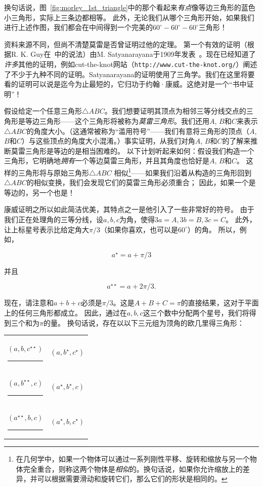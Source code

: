 换句话说，图~\ref{fig:morley_1st_triangle}中的那个看起来\emph{有点}像等边三角形的蓝色小三角形，实际上三条边都相等。
此外，无论我们从哪个三角形开始，如果我们进行上述作图，我们都会在中间得到一个完美的$60^\circ - 60^\circ - 60^\circ$三角形！

资料来源不同，但尚不清楚莫雷是否曾证明过他的定理。
第一个有效的证明（根据R. K. Guy在~\cite{lighthouse}中的说法）由M. Satyanarayana于1909年发表~\cite{satyana}。现在已经知道了\emph{许多}其他的证明，例如cut-the-knot网站（\verb+http://www.cut-the-knot.org/+）阐述了不少于九种不同的证明。Satyanarayana的证明使用了三角学。我们在这里将要看的证明可以说是迄今为止最短的，它归功于约翰·康威。这绝对是一个“书中证明”！

假设给定一个任意三角形${\triangle}ABC$。我们想要证明其顶点为相邻三等分线交点的三角形是等边三角形——这个三角形将被称为\emph{莫雷三角形}。我们还用$A$, $B$和$C$来表示${\triangle}ABC$的角度大小。（这通常被称为“滥用符号”——我们有意将三角形的顶点（$A$, $B$和$C$）与这些顶点的角度大小混淆。）事实证明，从我们对角$A$, $B$和$C$的了解来推断莫雷三角形是等边的是相当困难的。
以下计划听起来如何：假设我们构造一个三角形，它明确地\emph{拥有}一个等边莫雷三角形，并且其角度也恰好是$A$, $B$和$C$。
这样的三角形将与原始三角形${\triangle}ABC$ 相似\footnote{在几何学中，如果一个物体可以通过一系列刚性平移、旋转和缩放与另一个物体完全重合，则称这两个物体是\emph{相似}的。换句话说，如果你允许缩放上的差异，并可以根据需要滑动和旋转它们，那么它们的形状是相同的。}——如果我们沿着从构造的三角形回到${\triangle}ABC$的相似变换，我们会发现它们的莫雷三角形必须重合；
因此，如果一个是等边的，另一个也是！

康威证明之所以如此简洁优美，其特点之一是他引入了一些非常好的符号。
由于我们正在处理角的三等分线，设$a, b, c$为角，使得$3a=A, 3b=B, 3c=C$。
此外，让上标星号表示比给定角大$\pi/3$（如果你喜欢，也可以是$60^\circ$）的角。
所以，例如，

\[ a^\star = a + \pi/3 \]

\noindent 并且

\[ a^{\star\star} = a + 2\pi/3. \]

现在，请注意和$a+b+c$必须是$\pi/3$。这是$A+B+C=\pi$的直接结果，这对于平面上的任何三角形都成立。
因此，通过在$a, b, c$这三个数中分配两个星号，我们将得到三个和为$\pi$的量。
换句话说，存在以以下三元组为顶角的欧几里得三角形：

\begin{center}
\begin{tabular}{cc}
\rule{0pt}{18pt} $(a, b, c^{\star\star})$ \rule{18pt}{0pt} & $(a, b^\star, c^\star)$ \\
\rule{0pt}{18pt} $(a, b^{\star\star}, c)$ \rule{18pt}{0pt} & $(a^\star, b^\star, c)$ \\
\rule{0pt}{18pt} $(a^{\star\star}, b, c)$ \rule{18pt}{0pt} & $(a^\star, b, c^\star)$ \\
\end{tabular}
\end{center}


